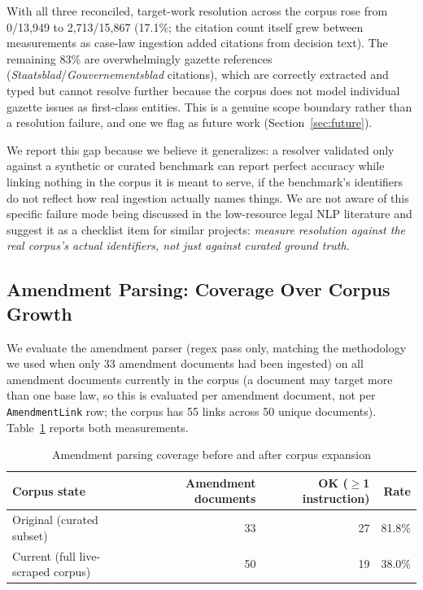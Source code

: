 \documentclass{IOS-Book-Article}
\begin{document}
With all three reconciled, target-work resolution across the corpus rose from 0/13,949 to
2,713/15,867 (17.1\%; the citation count itself grew between measurements as case-law
ingestion added citations from decision text). The remaining 83\% are overwhelmingly gazette
references (\emph{Staatsblad}/\emph{Gouvernementsblad} citations), which are correctly extracted and
typed but cannot resolve further because the corpus does not model individual gazette issues
as first-class entities. This is a genuine scope boundary rather than a resolution failure,
and one we flag as future work (Section~\ref{sec:future}).

We report this gap because we believe it generalizes: a resolver validated only against a
synthetic or curated benchmark can report perfect accuracy while linking nothing in the
corpus it is meant to serve, if the benchmark's identifiers do not reflect how real
ingestion actually names things. We are not aware of this specific failure mode being
discussed in the low-resource legal NLP literature and suggest it as a checklist item for
similar projects: \emph{measure resolution against the real corpus's actual identifiers, not just
against curated ground truth.}

\subsection{Amendment Parsing: Coverage Over Corpus Growth}
\label{sec:parsing-eval}

We evaluate the amendment parser (regex pass only, matching the methodology we used when
only 33 amendment documents had been ingested) on all amendment documents currently in the corpus (a document may
target more than one base law, so this is evaluated per amendment document, not per
\texttt{AmendmentLink} row; the corpus has 55 links across 50 unique documents). Table~\ref{tab:parsing}
reports both measurements.

\begin{table}[h]
\caption{Amendment parsing coverage before and after corpus expansion}
\label{tab:parsing}
\begin{tabular}{|l|r|r|r|}
\hline
\textbf{Corpus state} & \textbf{Amendment documents} & \textbf{OK ($\geq$1 instruction)} & \textbf{Rate} \\
\hline
Original (curated subset) & 33 & 27 & 81.8\% \\
Current (full live-scraped corpus) & 50 & 19 & 38.0\% \\
\hline
\end{tabular}
\end{table}
\end{document}
